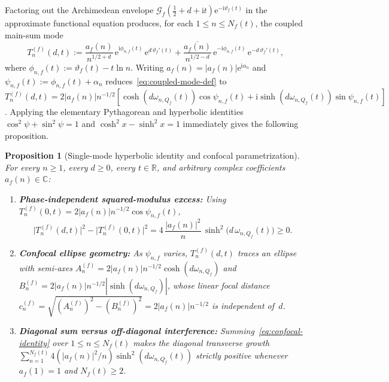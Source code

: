 \documentclass[11pt,reqno]{amsart}
\newtheorem{proposition}[theorem]{Proposition}
\theoremstyle{definition}
\theoremstyle{remark}
\numberwithin{equation}{section}
\newcommand{\R}{\mathbb{R}}
\newcommand{\C}{\mathbb{C}}
\newcommand{\ii}{\mathrm{i}}
\newcommand{\ee}{\mathrm{e}}
\begin{document}
Factoring out the Archimedean envelope $\mathcal{G}_f(\frac{1}{2}+d+\ii t)\ee^{-\ii\vartheta_f(t)}$ in the approximate functional equation produces, for each $1 \le n \le N_f(t)$, the coupled main-sum mode
\begin{equation}
  T_n^{(f)}(d,t) := \frac{a_f(n)}{n^{1/2+d}}\,\ee^{\ii\phi_{n,f}(t)}\,\ee^{d\,\vartheta_f'(t)} + \frac{\overline{a_f(n)}}{n^{1/2-d}}\,\ee^{-\ii\phi_{n,f}(t)}\,\ee^{-d\,\vartheta_f'(t)},
  \label{eq:coupled-mode-def}
\end{equation}
where $\phi_{n,f}(t) := \vartheta_f(t) - t\ln n$. Writing $a_f(n) = |a_f(n)|\ee^{\ii\alpha_n}$ and $\psi_{n,f}(t) := \phi_{n,f}(t) + \alpha_n$ reduces~\eqref{eq:coupled-mode-def} to $T_n^{(f)}(d,t) = 2|a_f(n)|n^{-1/2}[\cosh(d\omega_{n,Q_f}(t))\cos\psi_{n,f}(t) + \ii\sinh(d\omega_{n,Q_f}(t))\sin\psi_{n,f}(t)]$. Applying the elementary Pythagorean and hyperbolic identities $\cos^2\psi + \sin^2\psi = 1$ and $\cosh^2 x - \sinh^2 x = 1$ immediately gives the following proposition.

\begin{proposition}[Single-mode hyperbolic identity and confocal parametrization]
\label{prop:confocal-ellipse}
For every $n \ge 1$, every $d \ge 0$, every $t \in \R$, and arbitrary complex coefficients $a_f(n) \in \C$:
\begin{enumerate}[label=\textup{(\roman*)},leftmargin=2.2em]
  \item \textbf{Phase-independent squared-modulus excess:} Using $T_n^{(f)}(0,t) = 2|a_f(n)|\allowbreak n^{-1/2}\allowbreak\cos\psi_{n,f}(t)$,
  \begin{equation}
    \bigl|T_n^{(f)}(d,t)\bigr|^2 - \bigl|T_n^{(f)}(0,t)\bigr|^2
    = 4\,\frac{|a_f(n)|^2}{n}\,\sinh^2\bigl(d\,\omega_{n,Q_f}(t)\bigr) \ge 0.
    \label{eq:confocal-identity}
  \end{equation}
  \item \textbf{Confocal ellipse geometry:} As $\psi_{n,f}$ varies, $T_n^{(f)}(d,t)$ traces an ellipse with semi-axes $A_n^{(f)} = 2|a_f(n)|n^{-1/2}\cosh(d\omega_{n,Q_f})$ and $B_n^{(f)} = 2|a_f(n)|n^{-1/2}|\sinh(d\omega_{n,Q_f})|$, whose linear focal distance $c_n^{(f)} = \sqrt{(A_n^{(f)})^2 - (B_n^{(f)})^2} = 2|a_f(n)|n^{-1/2}$ is independent of~$d$.
  \item \textbf{Diagonal sum versus off-diagonal interference:} Summing~\eqref{eq:confocal-identity} over $1\le n\le N_f(t)$ makes the diagonal transverse growth $\sum_{n=1}^{N_f(t)} 4(|a_f(n)|^2/n)\sinh^2(d\omega_{n,Q_f}(t))$ strictly positive whenever $a_f(1)=1$ and $N_f(t)\ge 2$.
\end{enumerate}
\end{proposition}
\end{document}
